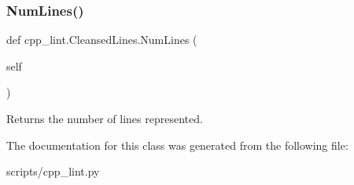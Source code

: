 \subsubsection{\texorpdfstring{Num\+Lines()}{NumLines()}}
{\footnotesize\ttfamily def cpp\+\_\+lint.\+Cleansed\+Lines.\+Num\+Lines (\begin{DoxyParamCaption}\item[{}]{self }\end{DoxyParamCaption})}

\begin{DoxyVerb}Returns the number of lines represented.\end{DoxyVerb}
 

The documentation for this class was generated from the following file\+:\begin{DoxyCompactItemize}
\item 
scripts/cpp\+\_\+lint.\+py\end{DoxyCompactItemize}
